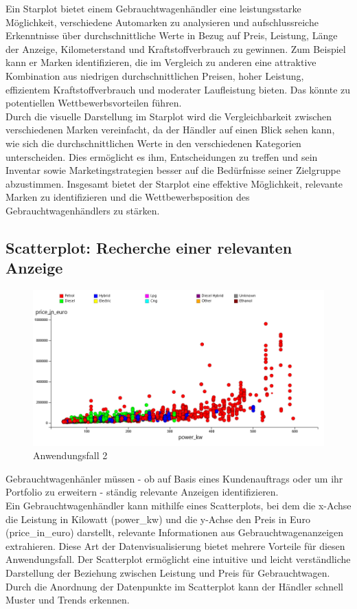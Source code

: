Ein Starplot bietet einem Gebrauchtwagenhändler eine leistungsstarke Möglichkeit, verschiedene Automarken zu analysieren und aufschlussreiche Erkenntnisse über durchschnittliche Werte in Bezug auf Preis, Leistung, Länge der Anzeige, Kilometerstand und Kraftstoffverbrauch zu gewinnen.  Zum Beispiel kann er Marken identifizieren, die im Vergleich zu anderen eine attraktive Kombination aus niedrigen durchschnittlichen Preisen, hoher Leistung, effizientem Kraftstoffverbrauch und moderater Laufleistung bieten. Das könnte zu potentiellen Wettbewerbsvorteilen führen. \\

Durch die visuelle Darstellung im Starplot wird die Vergleichbarkeit zwischen verschiedenen Marken vereinfacht, da der Händler auf einen Blick sehen kann, wie sich die durchschnittlichen Werte in den verschiedenen Kategorien unterscheiden. Dies ermöglicht es ihm,  Entscheidungen zu treffen und sein Inventar sowie Marketingstrategien besser auf die Bedürfnisse seiner Zielgruppe abzustimmen. Insgesamt bietet der Starplot eine effektive Möglichkeit, relevante Marken zu identifizieren und die Wettbewerbsposition des Gebrauchtwagenhändlers zu stärken. \\

\subsection{Scatterplot: Recherche einer relevanten Anzeige }

\begin{figure}[H]
    \centering
    \includegraphics{img/anwendung2.png}
    \caption{Anwendungsfall 2}
    \label{fig:aw2}
\end{figure}

Gebrauchtwagenhänler müssen - ob auf Basis eines Kundenauftrags oder um ihr Portfolio zu erweitern - ständig relevante Anzeigen identifizieren.\\
Ein Gebrauchtwagenhändler kann mithilfe eines Scatterplots, bei dem die x-Achse die Leistung in Kilowatt (power\_kw) und die y-Achse den Preis in Euro (price\_in\_euro) darstellt, relevante Informationen aus Gebrauchtwagenanzeigen extrahieren. Diese Art der Datenvisualisierung bietet mehrere Vorteile für diesen Anwendungsfall. Der Scatterplot ermöglicht eine intuitive und leicht verständliche Darstellung der Beziehung zwischen Leistung und Preis für Gebrauchtwagen. Durch die  Anordnung der Datenpunkte im Scatterplot kann der Händler schnell Muster und Trends erkennen. \\

